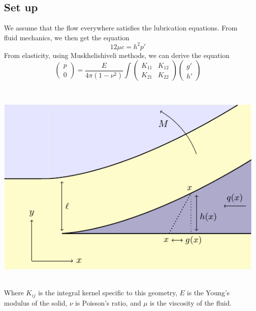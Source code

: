 \documentclass[11pt]{article}
\begin{document}
\subsection*{Set up}
\vspace{-4pt}
\begin{minipage}{0.5\linewidth}
We assume that the flow everywhere satisfies the lubrication equations. From 
fluid mechanics, we then get the equation
\vspace{-9pt}
\[12\mu c = h^2 p'\]
\vspace{-2pt}
From elasticity, using Muskhelishiveli methods, we can derive the equation
\[
\left( \begin{array}{c} p \\ 0 \end{array} \right)   =
\frac{E}{4\pi (1-\nu^2)} \int
\left(\begin{array}{cc} K_{11} & K_{12} \\ K_{21} & K_{22} \end{array} \right)
\left( \begin{array}{c} g' \\ h' \end{array} \right)  \]
\end{minipage}
\begin{minipage}{0.04\linewidth}
~
\end{minipage}
\begin{minipage}{0.5\linewidth}
\includegraphics[scale=0.8]{Fig1.pdf}
\end{minipage}
\\[11pt]
Where $K_{ij}$ is the integral kernel specific to this geometry,
$E$ is the Young's modulus of the solid, $\nu$ is Poisson's ratio, and  $\mu$ is 
the viscosity of the fluid.
\end{document}
